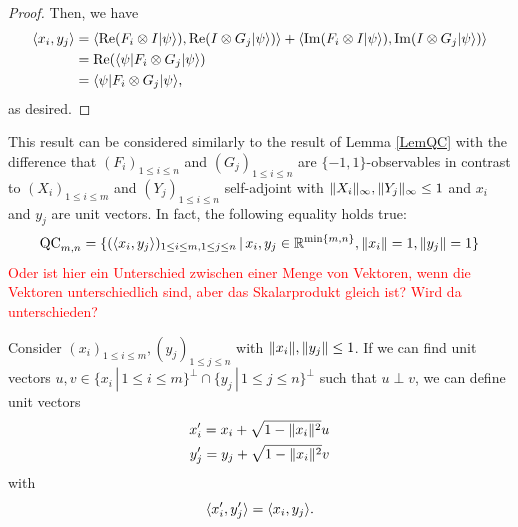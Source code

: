 \begin{proof}
		Then, we have
		\begin{align*}
			\langle{x_i},{y_j}\rangle &= \langle{\operatorname{Re}(F_i\ensuremath{\otimes}I \ensuremath{\vert {\psi} \rangle})},{\operatorname{Re}(I\otimes G_j \vert {\psi} \rangle)}\rangle+ \langle{\operatorname{Im}(F_i\ensuremath{\otimes}I \ensuremath{\vert {\psi} \rangle})},{\operatorname{Im}(I\otimes G_j \vert {\psi} \rangle)}\rangle\\
			&= \operatorname{Re}(\langle {\psi} \vert F_i\otimes G_j \vert {\psi} \rangle) \\
			&= \langle {\psi} \vert F_i\otimes G_j \vert {\psi} \rangle,
		\end{align*}
		as desired.
	\end{proof}
	
	This result can be considered similarly to the result of Lemma \ref{LemQC} with the difference that $(F_i)_{1\leq i \leq n}$ and $(G_j)_{1\leq i \leq n}$ are $\{-1,1\}$-observables in contrast to $(X_i)_{1\leq i \leq m}$ and $(Y_j)_{1\leq i \leq n}$ self-adjoint with $ \Vert {X_i} \Vert_\infty, \Vert {Y_j} \Vert_\infty\leq 1$ and $x_i$ and $y_j$ are unit vectors. In fact, the following equality holds true:
	\begin{equation}
		\textup{QC}_{m,n} = \{(\langle{x_i},{y_j}\rangle)_{1\leq i\leq m, 1\leq j \leq n} \,| \, x_i,y_j \in \mathbb{R}^{\min\{m,n\}},  \Vert {x_i} \Vert=1,  \Vert {y_j} \Vert=1\}
	\end{equation}
	\textcolor{red}{Oder ist hier ein Unterschied zwischen einer Menge von Vektoren, wenn die Vektoren unterschiedlich sind, aber das Skalarprodukt gleich ist? Wird da unterschieden?}
	
	Consider $(x_i)_{1\leq i \leq m},(y_j)_{1\leq j \leq n}$ with $ \Vert {x_i} \Vert, \Vert {y_j} \Vert \leq 1$. If we can find unit vectors $u,v\in\{x_i\,| \, 1\leq i \leq m\}^\perp \cap \{y_j\,| \, 1\leq j \leq n\}^\perp$ such that $u\perp v$, we can define unit vectors
	\begin{align*}
		x_i^\prime = x_i + \sqrt{1- \Vert {x_i} \Vert^2}u\\
		y_j^\prime = y_j + \sqrt{1- \Vert {x_i} \Vert^2}v\\  
	\end{align*}
	with
	\[
		\langle{x_i^\prime},{y_j^\prime}\rangle = \langle{x_i},{y_j}\rangle.
	\] 
	
	
